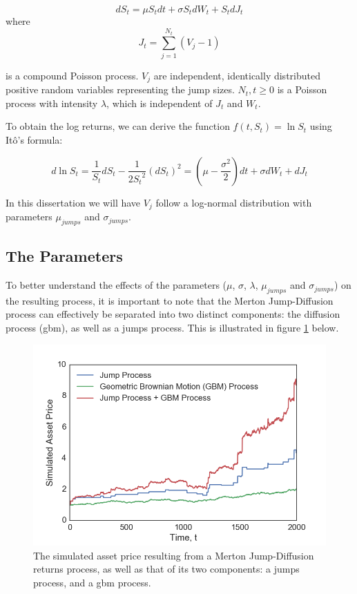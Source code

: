 \documentclass[11pt,oneside,openany,a4paper,english, report, goldenblock
]{usthesis}
\begin{document}
\begin{equation}
d S_t =  \mu S_t dt  +\sigma S_t dW_t + S_t dJ_t 
\end{equation}
where
\begin{equation}
J_t = \sum_{j=1}^{N_t}(V_j - 1)
\end{equation}

is a compound Poisson process. $V_j$ are independent, identically distributed positive random variables representing the jump sizes. $N_t, t \geq 0$ is a Poisson process with intensity $\lambda$, which is independent of $J_t$ and $W_t$.

To obtain the log returns, we can derive the function $f(t, S_t) = \ln{S_t}$ using It\^{o}'s formula:

\begin{equation} \label{equation:merton_log_returns}
d\ln{S_t} = \frac{1}{S_t}dS_t - \frac{1}{2{S_t}^2}\left(dS_t\right)^2 = \left( \mu - \frac{\sigma^2}{2} \right)dt +\sigma dW_t + dJ_t 
\end{equation}

In this dissertation we will have $V_j$ follow a log-normal distribution with parameters $\mu_{jumps}$ and $\sigma_{jumps}$.

\subsection{The Parameters}

To better understand the effects of the parameters ($\mu$, $\sigma$, $\lambda$, $\mu_{jumps}$ and $\sigma_{jumps}$) on the resulting process, it is important to note that the Merton Jump-Diffusion process can effectively be separated into two distinct components: the diffusion process (\acrshort{gbm}), as well as a jumps process. This is illustrated in figure \ref{fig:merton_jd_components} below.

\begin{figure}[h]
	\centering
	\includegraphics[width=0.7\linewidth]{Images/Parameter-Effects/Merton_JD_Components}
	\caption[The components of a simulated path from the Merton Jump-Diffusion process]{The simulated asset price resulting from a Merton Jump-Diffusion returns process, as well as that of its two components: a jumps process, and a \acrshort{gbm} process.}
	\label{fig:merton_jd_components}
\end{figure}
\end{document}
